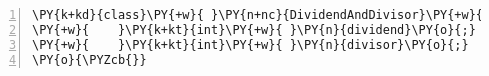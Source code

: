 \begin{Verbatim}[commandchars=\\\{\},numbers=left,firstnumber=1,stepnumber=1,frame=single,fontsize=\small]
\PY{k+kd}{class}\PY{+w}{ }\PY{n+nc}{DividendAndDivisor}\PY{+w}{ }\PY{o}{\PYZob{}}
\PY{+w}{    }\PY{k+kt}{int}\PY{+w}{ }\PY{n}{dividend}\PY{o}{;}
\PY{+w}{    }\PY{k+kt}{int}\PY{+w}{ }\PY{n}{divisor}\PY{o}{;}
\PY{o}{\PYZcb{}}
\end{Verbatim}
